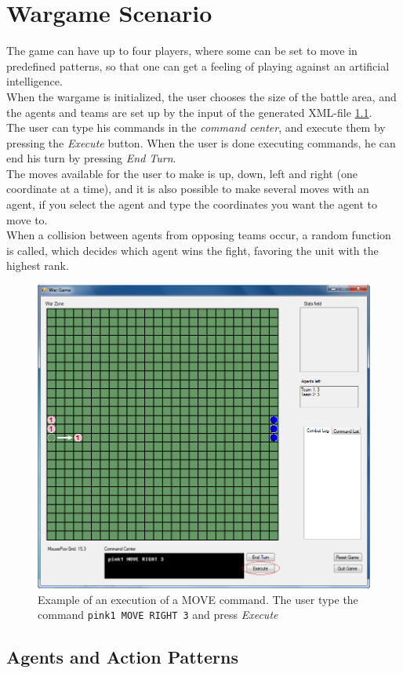 \section{Wargame Scenario}
\label{sec:wargame}

The game can have up to four players, where some can be set to move in predefined patterns, so that one can get a feeling of playing against an artificial intelligence.\\
	When the wargame is initialized, the user chooses the size of the battle area, and the agents and teams are set up by the input of the generated XML-file \ref{agents_patterns}.\\
	The user can type his commands in the \textit{command center}, and execute them by pressing the \textit{Execute} button. When the user is done executing commands, he can end his turn by pressing \textit{End Turn}.\\
	The moves available for the user to make is up, down, left and right (one coordinate at a time), and it is also possible to make several moves with an agent, if you select the agent and type the coordinates you want the agent to move to.\\
  When a collision between agents from opposing teams occur, a random function is called, which decides which agent wins the fight, favoring the unit with the highest rank.
	
\begin{figure}[H]
\begin{center}
\includegraphics[scale=0.6]{Images/ex_com.png}
\end{center}
\caption{Example of an execution of a MOVE command. The user type the command \texttt{pink1 MOVE RIGHT 3} and press \textit{Execute}}
\label{fig:ex_com}
\end{figure}

\subsection{Agents and Action Patterns}
\label{agents_patterns}

